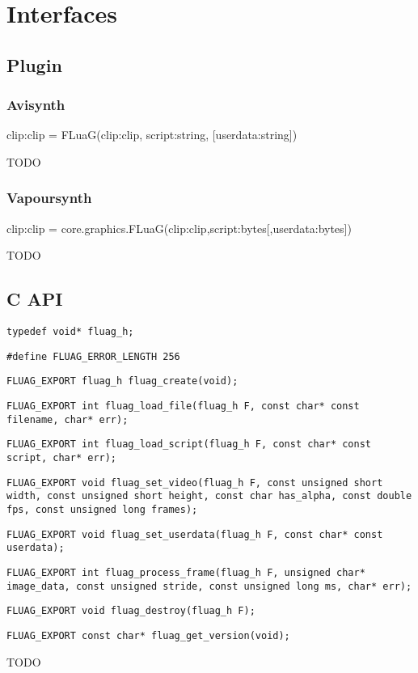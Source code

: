 \section{Interfaces}
\label{sec:interfaces}

\subsection{Plugin}
\label{sec:plugin}

\subsubsection{Avisynth}
\label{sec:avisynth}

clip:clip = FLuaG(clip:clip, script:string, [userdata:string])

TODO

\subsubsection{Vapoursynth}
\label{sec:vapoursynth}

clip:clip = core.graphics.FLuaG(clip:clip,script:bytes[,userdata:bytes])

TODO

\subsection{C API}
\label{sec:c-api}

\verb|typedef void* fluag_h;|

\verb|#define FLUAG_ERROR_LENGTH 256|

\verb|FLUAG_EXPORT fluag_h fluag_create(void);|

\verb|FLUAG_EXPORT int fluag_load_file(fluag_h F, const char* const filename, char* err);|

\verb|FLUAG_EXPORT int fluag_load_script(fluag_h F, const char* const script, char* err);|

\verb|FLUAG_EXPORT void fluag_set_video(fluag_h F, const unsigned short width, const unsigned short height, const char has_alpha, const double fps, const unsigned long frames);|

\verb|FLUAG_EXPORT void fluag_set_userdata(fluag_h F, const char* const userdata);|

\verb|FLUAG_EXPORT int fluag_process_frame(fluag_h F, unsigned char* image_data, const unsigned stride, const unsigned long ms, char* err);|

\verb|FLUAG_EXPORT void fluag_destroy(fluag_h F);|

\verb|FLUAG_EXPORT const char* fluag_get_version(void);|

TODO

